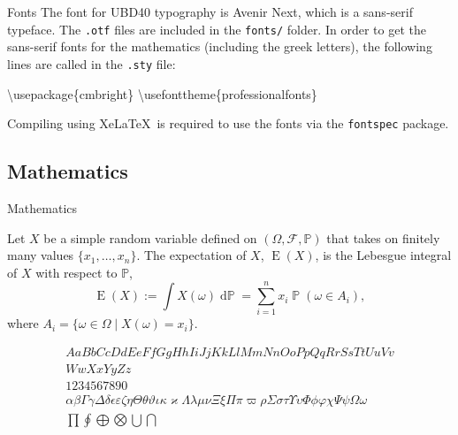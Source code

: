 \documentclass[,aspectratio=43]{beamer}
\newenvironment{Shaded}{\begin{snugshade}}{\end{snugshade}}
\newcommand{\BuiltInTok}[1]{#1}
\newcommand{\ExtensionTok}[1]{#1}
\newcommand{\FunctionTok}[1]{\textcolor[rgb]{0.00,0.00,0.00}{#1}}
\newcommand{\NormalTok}[1]{#1}
\begin{document}
\begin{frame}[fragile]{Fonts}
\label{fonts}
The font for UBD40 typography is Avenir Next, which is a sans-serif
typeface. The \texttt{.otf} files are included in the \texttt{fonts/}
folder. In order to get the sans-serif fonts for the mathematics
(including the greek letters), the following lines are called in the
\texttt{.sty} file:

\begin{Shaded}
\begin{Highlighting}[]
\BuiltInTok{\textbackslash{}usepackage}\NormalTok{\{}\ExtensionTok{cmbright}\NormalTok{\}}
\FunctionTok{\textbackslash{}usefonttheme}\NormalTok{\{professionalfonts\}}
\end{Highlighting}
\end{Shaded}

Compiling using Xe\LaTeX~is required to use the fonts via the
\texttt{fontspec} package.
\end{frame}

\subsection{Mathematics}\label{mathematics}

\begin{frame}{Mathematics}
\vspace{0.5em}

Let \(X\) be a simple random variable defined on
\((\Omega,\mathcal F,\mathbb P)\) that takes on finitely many values
\(\{x_1,\dots,x_n\}\). The expectation of \(X\),
\(\operatorname{E}(X)\), is the Lebesgue integral of \(X\) with respect
to \(\mathbb P\), \[
\operatorname{E}(X) := \int X(\omega) \operatorname{d \mathbb P} = \sum_{i=1}^n x_i \operatorname{\mathbb P}(\omega \in A_i),
\] where \(A_i=\{\omega\in\Omega \mid X(\omega)=x_i \}\).

\vspace{-0.5em}

\begin{gather*}
AaBbCcDdEeFfGgHhIiJjKkLlMmNnOoPpQqRrSsTtUuVv\\WwXxYyZz \\[0.5em]
1234567890 \\[0.5em]
\alpha
 \beta
\Gamma  \gamma
\Delta  \delta
\epsilon  \varepsilon
\zeta
\eta
\Theta \theta  \vartheta
\iota
\kappa  \varkappa
\Lambda  \lambda
\mu
\nu
\Xi  \xi
\Pi \pi  \varpi
\rho
\Sigma \sigma
\tau
\Upsilon  \upsilon
\Phi \phi  \varphi
\chi
\Psi  \psi
\Omega  \omega \\[0.5em]
\prod \oint \bigoplus \bigotimes \bigcup \bigcap
\end{gather*}
\end{frame}
\end{document}
